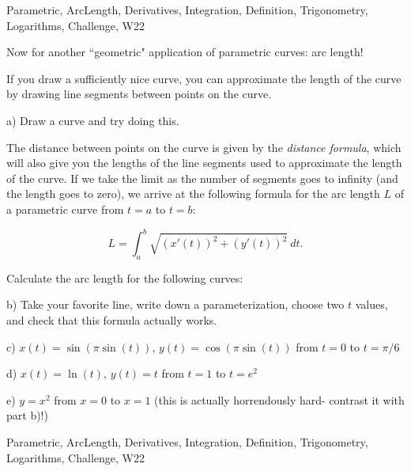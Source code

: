 \begin{tagblock}{Parametric, ArcLength, Derivatives, Integration, Definition, Trigonometry, Logarithms, Challenge, W22}
\begin{question}

Now for another ``geometric" application of parametric curves: arc length!

\bigskip

If you draw a sufficiently nice curve, you can approximate the length of the curve by drawing line segments between points on the curve.

\bigskip

a) Draw a curve and try doing this. 

\bigskip

The distance between points on the curve is given by the \textit{distance formula}, which will also give you the lengths of the line segments used to approximate the length of the curve. If we take the limit as the number of segments goes to infinity (and the length goes to zero), we arrive at the following formula for the arc length $L$ of a parametric curve from $t=a$ to $t=b$:

\bigskip
\[
L=\int_a^b\sqrt{(x'(t))^2+(y'(t))^2} \ dt.
\]

Calculate the arc length for the following curves: 

\bigskip

b) Take your favorite line, write down a parameterization, choose two $t$ values, and check that this formula actually works. 

\bigskip

c) $x(t)=\sin(\pi\sin(t))$, $y(t)=\cos(\pi\sin(t))$ from $t=0$ to $t=\pi/6$

\bigskip

d) $x(t)=\ln(t)$, $y(t)=t$ from $t=1$ to $t=e^2$

\bigskip

e) $y=x^2$ from $x=0$ to $x=1$ (this is actually horrendously hard- contrast it with part b)!)
	
	
\begin{tags}
	    Parametric, ArcLength, Derivatives, Integration, Definition, Trigonometry, Logarithms, Challenge, W22
\end{tags}
	
\begin{diary}
\end{diary}
	
\begin{solution}
	   
\end{solution}
	
\end{question}

\end{tagblock}

